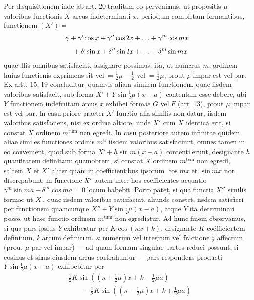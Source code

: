 Per disquisitionem inde ab art. 20 traditam eo pervenimus. ut propositis $\mu$
valoribus functionis $X$ arcus indeterminati $x$, periodum completam formantibus, functionem $(X')=$
\[
\begin{aligned}
&\gamma+\gamma'\cos x+\gamma''\cos2x+\mathinner{.\,.\,.}+\gamma^m\cos mx\\[5pt]
&\quad+\delta'\sin x+\delta''\sin2x+\mathinner{.\,.\,.}+\delta^m\sin mx
\end{aligned}
\]
quae illis omnibus satisfaciat, assignare possimus, ita, ut numerus $m$, ordinem
huius functionis exprimens sit vel $=\frac12\mu-\frac12$ vel $=\frac12\mu$, prout $\mu$ impar est vel
par. Ex artt. 15, 19 concluditur, quamvis aliam similem functionem, quae iisdem valoribus satisfacit, sub forma $X'+Y\sin\frac12\mu(x-a)$ contentam esse debere,
ubi $Y$ functionem indefinitam arcus $x$ exhibet formae $G$ vel $F$ (art. 13), prout $\mu$
impar est vel par. In casu priore praeter $X'$ functio alia similis non datur, iisdem
valoribus satisfaciens, nisi ex ordine altiore, unde $X'$ cum $X$ identica erit, si
constat $X$ ordinem $m^{\mathrm{tum}}$ non egredi. In casu posteriore autem infinitae quidem
aliae similes functiones ordinis $m^{\mathrm{ti}}$ iisdem valoribus satisfaciunt, omnes tamen in
eo convenient, quod sub forma $X'+h\sin m(x-a)$ contenti erunt, designante
$h$ quantitatem definitam: quamobrem, si constat $X$ ordinem $m^{\mathrm{tum}}$ non egredi,
saltem $X$ et $X'$ aliter quam in co\"efficientibus ipsorum $\cos mx$ et $\sin mx$
non discrepabunt; in functione $X'$ autem inter hos co\"efficientes aequatio
$\gamma^m\sin ma-\delta^m\cos ma=0$ locum habebit. Porro patet, si qua functio $X''$ similis formae ut $X'$, quae iisdem valoribus satisfaciat, aliunde constet, iisdem satisfieri per functionem quamcunque $X''+Y\sin\frac12\mu(x-a)$, atque $Y$ ita determinari posse, ut haec functio ordinem $m^{\mathrm{tum}}$ non egrediatur. Ad hunc finem observamus, si qua pars ipsius $Y$ exhibeatur per $K\cos(\kappa x+k)$, designante $K$
co\"efficientem definitum, $k$ arcum definitum, $\kappa$ numerum vel integrum vel fractione
$\frac12$ affectum (prout $\mu$ par vel impar) --- ad quam formam singulae partes reduci
possunt, si cosinus et sinus eiusdem arcus contrahuntur --- pars respondens producti $Y\sin\frac12\mu(x-a)$ exhibebitur per
\[
\begin{aligned}
&\frac12K\sin((\kappa+\frac12\mu)x+k-\frac12\mu a)\\[5pt]&\qquad{}-\frac12K\sin((\kappa-\frac12\mu)x+k+\frac12\mu a)
\end{aligned}
\]
